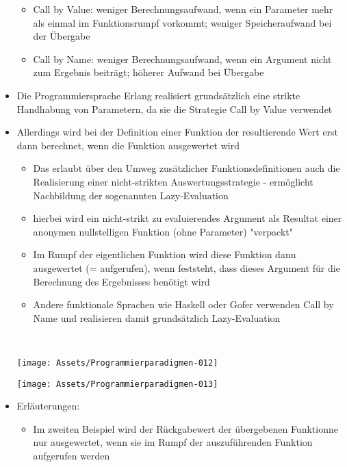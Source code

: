 \documentclass[10pt]{article}
\begin{document}
\begin{itemize}
\begin{itemize}
          \item Call by Value: weniger Berechnungsaufwand, wenn ein Parameter mehr als einmal im Funktionsrumpf vorkommt; weniger Speicheraufwand bei der Übergabe
          \item Call by Name: weniger Berechnungsaufwand, wenn ein Argument nicht zum Ergebnis beiträgt; höherer Aufwand bei Übergabe
        \end{itemize}
  \item Die Programmiersprache Erlang realisiert grundsätzlich eine strikte Handhabung von Parametern, da sie die Strategie Call by Value verwendet
  \item Allerdings wird bei der Definition einer Funktion der resultierende Wert erst dann berechnet, wenn die Funktion ausgewertet wird
        \begin{itemize}
          \item Das erlaubt über den Umweg zusätzlicher Funktionsdefinitionen auch die Realisierung einer nicht-strikten Auswertungsstrategie - ermöglicht Nachbildung der sogenannten Lazy-Evaluation
          \item hierbei wird ein nicht-strikt zu evaluierendes Argument als Resultat einer anonymen nullstelligen Funktion (ohne Parameter) "verpackt"
          \item Im Rumpf der eigentlichen Funktion wird diese Funktion dann ausgewertet (= aufgerufen), wenn feststeht, dass dieses Argument für die Berechnung des Ergebnisses benötigt wird
          \item Andere funktionale Sprachen wie Haskell oder Gofer verwenden Call by Name und realisieren damit grundsätzlich Lazy-Evaluation
        \end{itemize}
        \ \linebreak 
        \begin{center}
          \centering
          \texttt{[image: Assets/Programmierparadigmen-012]}
        \end{center}
        \begin{center}
          \centering
          \texttt{[image: Assets/Programmierparadigmen-013]}
        \end{center}
  \item Erläuterungen:
        \begin{itemize}
          \item Im zweiten Beispiel wird der Rückgabewert der übergebenen Funktionne nur ausgewertet, wenn sie im Rumpf der auszuführenden Funktion aufgerufen werden

\end{itemize}
\end{itemize}
\end{document}
